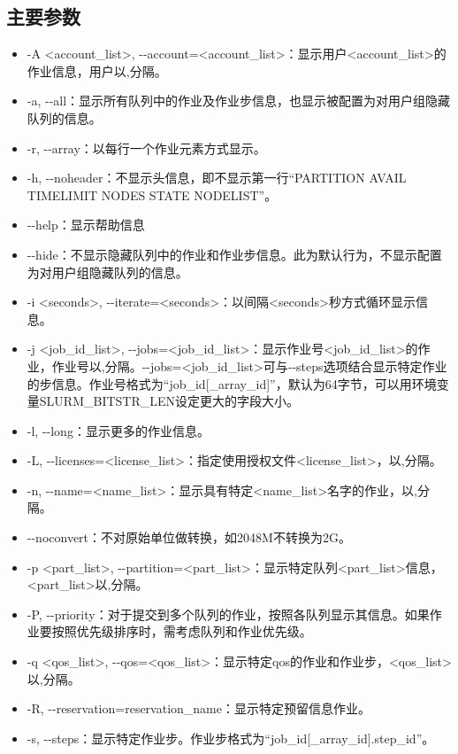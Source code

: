\subsection{主要参数}
\begin{itemize}
	\item -A <account\_list>, -{}-account=<account\_list>：显示用户<account\_list>的作业信息，用户以,分隔。
	\item -a, -{}-all：显示所有队列中的作业及作业步信息，也显示被配置为对用户组隐藏队列的信息。
	\item -r, -{}-array：以每行一个作业元素方式显示。
	\item -h, -{}-noheader：不显示头信息，即不显示第一行``PARTITION AVAIL  TIMELIMIT  NODES  STATE NODELIST''。
	\item -{}-help：显示帮助信息
	\item -{}-hide：不显示隐藏队列中的作业和作业步信息。此为默认行为，不显示配置为对用户组隐藏队列的信息。
	\item -i <seconds>, -{}-iterate=<seconds>：以间隔<seconds>秒方式循环显示信息。
	\item -j <job\_id\_list>, -{}-jobs=<job\_id\_list>：显示作业号<job\_id\_list>的作业，作业号以,分隔。-{}-jobs=<job\_id\_list>可与-{}-steps选项结合显示特定作业的步信息。作业号格式为``job\_id[\_array\_id]''，默认为64字节，可以用环境变量SLURM\_BITSTR\_LEN设定更大的字段大小。
	\item -l, -{}-long：显示更多的作业信息。
	\item -L, -{}-licenses=<license\_list>：指定使用授权文件<license\_list>，以,分隔。
	\item -n, -{}-name=<name\_list>：显示具有特定<name\_list>名字的作业，以,分隔。
	\item -{}-noconvert：不对原始单位做转换，如2048M不转换为2G。
	\item -p <part\_list>, -{}-partition=<part\_list>：显示特定队列<part\_list>信息，<part\_list>以,分隔。
	\item -P, -{}-priority：对于提交到多个队列的作业，按照各队列显示其信息。如果作业要按照优先级排序时，需考虑队列和作业优先级。
	\item -q <qos\_list>, -{}-qos=<qos\_list>：显示特定qos的作业和作业步，<qos\_list>以,分隔。
	\item -R, -{}-reservation=reservation\_name：显示特定预留信息作业。
	\item -s, -{}-steps：显示特定作业步。作业步格式为``job\_id[\_array\_id].step\_id''。

\end{itemize}
